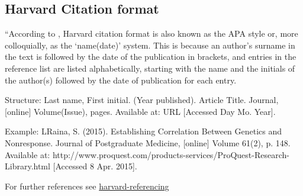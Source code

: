 
\subsection{Harvard Citation format}

“According to \cite{James2008}, Harvard citation format is also known as the APA style or, more colloquially, as the ‘name(date)’ system. This is because an author’s surname in the text is followed by the date of the publication in brackets, and entries in the reference list are listed alphabetically, starting with the name and the initials of the author(s) followed by the date of publication for each entry.

Structure: Last name, First initial. (Year published). Article Title. Journal, [online] Volume(Issue), pages. Available at: URL [Accessed Day Mo. Year].

Example: LRaina, S. (2015). Establishing Correlation Between Genetics and Nonresponse. Journal of Postgraduate Medicine, [online] Volume 61(2), p. 148. Available at: http://www.proquest.com/products-services/ProQuest-Research-Library.html [Accessed 8 Apr. 2015].

For further references see \href{http://www.citethisforme.com/harvard-referencing}{harvard-referencing}
